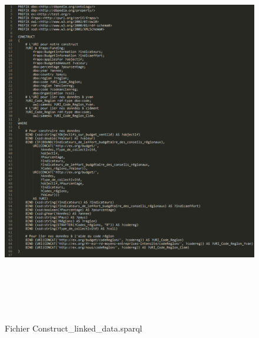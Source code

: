 \documentclass[a4paper,sffamily,12pt]{article}
\begin{document}
		\begin{figure}[!h]
			
			\vspace{0.5cm}	
			\centerline{\includegraphics[height=17cm]{picture/constructv2.png}}
			\caption{Fichier Construct\_linked\_data.sparql}
			\label{constructv2}
			
		\end{figure}		

		\newpage		
\end{document}
